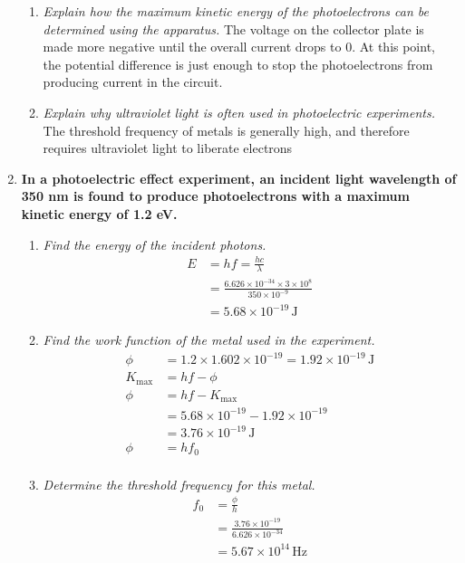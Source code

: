 \documentclass{report}
\begin{document}
\begin{enumerate}
\begin{enumerate}
					\item \textit{Explain how the maximum kinetic energy of the photoelectrons can be determined using the apparatus.}
						\subitem The voltage on the collector plate is made more negative until the overall current drops to 0. At this point, the potential difference is just enough to stop the photoelectrons from producing current in the circuit.

					\item \textit{Explain why ultraviolet light is often used in photoelectric experiments.}
						\subitem The threshold frequency of metals is generally high, and therefore requires ultraviolet light to liberate electrons
				\end{enumerate}

			\item \textbf{In a photoelectric effect experiment, an incident light wavelength of 350 nm is found to produce photoelectrons with a maximum kinetic energy of 1.2 eV.}
				\begin{enumerate}
					\item \textit{Find the energy of the incident photons.}
						\begin{align*}
							E &= hf = \frac{hc}{\lambda} \\
							  &= \frac{6.626 \times 10^{-34} \times 3 \times 10^8}{350 \times 10^{-9}} \\
							  &= 5.68 \times 10^{-19} \, \text{J}
						\end{align*}

					\item \textit{Find the work function of the metal used in the experiment.}
						\begin{align*}
							\phi &= 1.2 \times 1.602 \times 10^{-19} = 1.92 \times 10^{-19} \, \text{J} \\
							K_{\text{max}} &= hf - \phi \\
							\phi &= hf - K_{\text{max}} \\
							&= 5.68 \times 10^{-19} - 1.92 \times 10^{-19} \\
							&= 3.76 \times 10^{-19} \, \text{J} \\
							\phi &= hf_0 \\
						\end{align*}

					\item \textit{Determine the threshold frequency for this metal.}
						\begin{align*}
							f_0 &= \frac{\phi}{h} \\
							&= \frac{3.76 \times 10^{-19}}{6.626 \times 10^{-34}} \\
							&= 5.67 \times 10^{14} \, \text{Hz}
						\end{align*}
				\end{enumerate}
		\end{enumerate}
	
\end{document}
